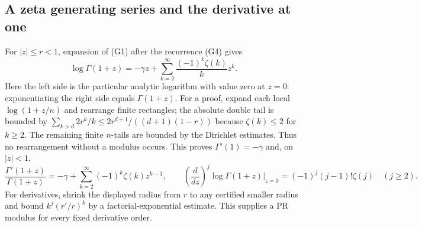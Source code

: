 \subsection{A zeta generating series and the derivative at one}
For $|z|\le r<1$, expansion of (G1) after the recurrence (G4) gives
\[
 \log\Gamma(1+z)
   =-\gamma z+\sum_{k=2}^{\infty}
                    \frac{(-1)^k\zeta(k)}{k}z^k.
 \tag{G12}\label{eq:log-gamma-zeta}
\]
Here the left side is the particular analytic logarithm with value zero
at $z=0$: exponentiating the right side equals $\Gamma(1+z)$.
For a proof, expand each local $\log(1+z/n)$ and rearrange finite
rectangles; the absolute double tail is bounded by
$\sum_{k>d}2r^k/k\le2r^{d+1}/((d+1)(1-r))$ because $\zeta(k)\le2$
for $k\ge2$. The remaining finite $n$-tails are bounded by the Dirichlet
estimates. Thus no rearrangement without a modulus occurs.
This proves $\Gamma'(1)=-\gamma$ and, on $|z|<1$,
\[
 \frac{\Gamma'(1+z)}{\Gamma(1+z)}
   =-\gamma+\sum_{k=2}^{\infty}(-1)^k\zeta(k)z^{k-1},
 \qquad
 \left(\frac{d}{dz}\right)^j\!\log\Gamma(1+z)\bigg|_{z=0}
 =(-1)^j(j-1)!\zeta(j)\quad(j\ge2).
\]
For derivatives, shrink the displayed radius from $r$ to any certified
smaller radius and bound $k^j(r'/r)^k$ by a factorial-exponential
estimate. This supplies a PR modulus for every fixed derivative order.
